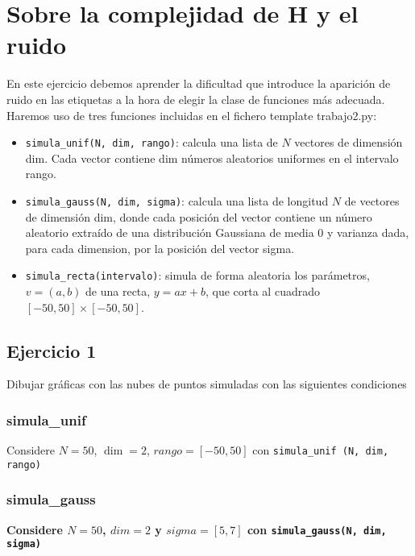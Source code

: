 \chapter{Sobre la complejidad de H y el ruido}

En este ejercicio debemos aprender la dificultad que introduce la aparición de
ruido en las etiquetas a la hora de elegir la clase de funciones más adecuada.
Haremos uso de tres funciones incluidas en el fichero template trabajo2.py:

\begin{itemize}

\item \texttt{simula_unif(N, dim, rango)}: calcula una lista de $N$
vectores de dimensión dim. Cada vector contiene dim números aleatorios uniformes
en el intervalo rango. 

\item \texttt{simula_gauss(N, dim, sigma)}: calcula una lista de
longitud $N$ de vectores de dimensión dim, donde cada posición del vector
contiene un número aleatorio extraído de una distribución Gaussiana de media
$0$ y varianza dada, para cada dimension, por la posición del vector sigma.  

\item \texttt{simula_recta(intervalo)}: simula de forma aleatoria
los parámetros, $v = (a, b)$ de una recta, $y = ax + b$, que corta al cuadrado
$[-50, 50] \times [-50, 50]$.

\end{itemize}

\section{Ejercicio 1}
Dibujar gráficas con las nubes de puntos simuladas con las siguientes
condiciones

\subsection{simula\_unif}

Considere $N = 50$, $\dim = 2$, $rango = [-50, 50]$ con  
\texttt{simula_unif (N, dim, rango)}


\subsection{simula\_gauss}

\textbf{Considere $N = 50$, $dim = 2$ y $sigma = [5, 7]$ con 
\texttt{simula_gauss(N, dim, sigma)}}

